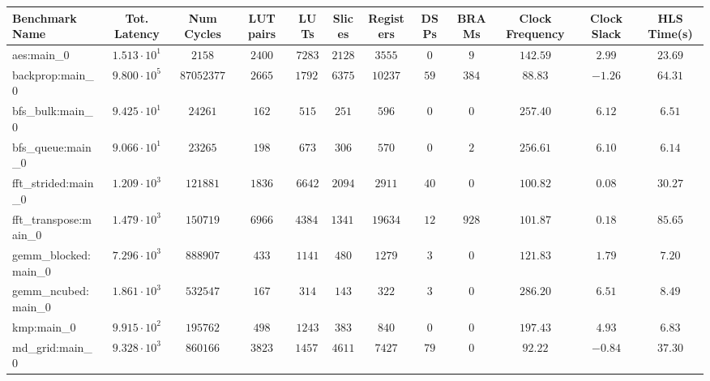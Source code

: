 \begin{tabular}{|l|c|c|c|c|c|c|c|c|c|c|c|}
\hline
Benchmark Name         & Tot. Latency           & Num Cycles   & LUT pairs & LUTs       & Slices    & Registers & DSPs    & BRAMs    & Clock Frequency & Clock Slack & HLS Time(s) \\
\hline
aes:main\_0            & $ 1.513 \cdot 10^{1} $ & $ 2158     $ & $ 2400  $ & $ 7283   $ & $ 2128  $ & $ 3555  $ & $ 0   $ & $ 9    $ & $ 142.59      $ & $ 2.99    $ & $ 23.69   $ \\
backprop:main\_0       & $ 9.800 \cdot 10^{5} $ & $ 87052377 $ & $ 2665  $ & $ 17927  $ & $ 6375  $ & $ 10237 $ & $ 59  $ & $ 384  $ & $ 88.83       $ & $ -1.26   $ & $ 64.31   $ \\
bfs\_bulk:main\_0      & $ 9.425 \cdot 10^{1} $ & $ 24261    $ & $ 162   $ & $ 515    $ & $ 251   $ & $ 596   $ & $ 0   $ & $ 0    $ & $ 257.40      $ & $ 6.12    $ & $ 6.51    $ \\
bfs\_queue:main\_0     & $ 9.066 \cdot 10^{1} $ & $ 23265    $ & $ 198   $ & $ 673    $ & $ 306   $ & $ 570   $ & $ 0   $ & $ 2    $ & $ 256.61      $ & $ 6.10    $ & $ 6.14    $ \\
fft\_strided:main\_0   & $ 1.209 \cdot 10^{3} $ & $ 121881   $ & $ 1836  $ & $ 6642   $ & $ 2094  $ & $ 2911  $ & $ 40  $ & $ 0    $ & $ 100.82      $ & $ 0.08    $ & $ 30.27   $ \\
fft\_transpose:main\_0 & $ 1.479 \cdot 10^{3} $ & $ 150719   $ & $ 6966  $ & $ 43842  $ & $ 13410 $ & $ 19634 $ & $ 12  $ & $ 928  $ & $ 101.87      $ & $ 0.18    $ & $ 85.65   $ \\
gemm\_blocked:main\_0  & $ 7.296 \cdot 10^{3} $ & $ 888907   $ & $ 433   $ & $ 1141   $ & $ 480   $ & $ 1279  $ & $ 3   $ & $ 0    $ & $ 121.83      $ & $ 1.79    $ & $ 7.20    $ \\
gemm\_ncubed:main\_0   & $ 1.861 \cdot 10^{3} $ & $ 532547   $ & $ 167   $ & $ 314    $ & $ 143   $ & $ 322   $ & $ 3   $ & $ 0    $ & $ 286.20      $ & $ 6.51    $ & $ 8.49    $ \\
kmp:main\_0            & $ 9.915 \cdot 10^{2} $ & $ 195762   $ & $ 498   $ & $ 1243   $ & $ 383   $ & $ 840   $ & $ 0   $ & $ 0    $ & $ 197.43      $ & $ 4.93    $ & $ 6.83    $ \\
md\_grid:main\_0       & $ 9.328 \cdot 10^{3} $ & $ 860166   $ & $ 3823  $ & $ 14577  $ & $ 4611  $ & $ 7427  $ & $ 79  $ & $ 0    $ & $ 92.22       $ & $ -0.84   $ & $ 37.30   $ \\

\end{tabular}

